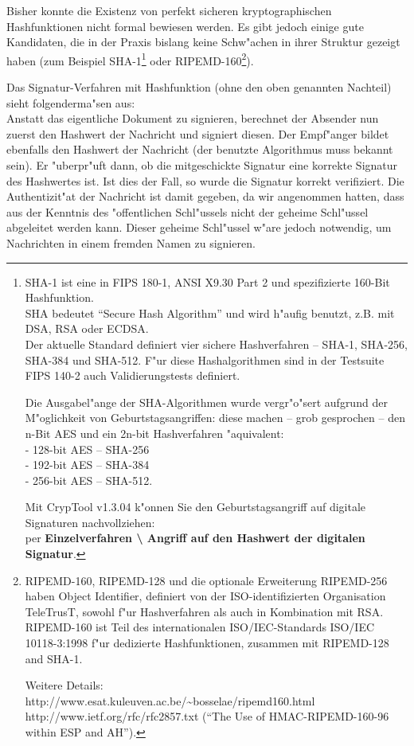 Bisher konnte die Existenz von perfekt sicheren kryptographischen
Hashfunktionen nicht formal bewiesen werden. Es gibt jedoch einige gute
Kandidaten, die in der Praxis bislang keine Schw"achen in ihrer Struktur
gezeigt haben (zum Beispiel  SHA-1\footnote{%
SHA-1  ist eine in FIPS 180-1, ANSI X9.30 Part 2 und
\cite{FIPS186} spezifizierte 160-Bit Hashfunktion.\\
SHA bedeutet ``Secure Hash Algorithm'' und wird h"aufig benutzt, z.B. 
mit DSA, RSA oder ECDSA.\\
Der aktuelle Standard \cite{FIPS180-2} definiert vier sichere Hashverfahren
-- SHA-1, SHA-256, SHA-384 und SHA-512.
F"ur diese Hashalgorithmen sind in der Testsuite FIPS 140-2 auch
Validierungstests definiert.

Die Ausgabel"ange der SHA-Algorithmen wurde vergr"o"sert aufgrund der
M"oglichkeit von Geburtstagsangriffen:
 
diese machen -- grob gesprochen -- den n-Bit AES und ein 2n-bit 
Hashverfahren "aquivalent: \\
- 128-bit AES -- SHA-256 \\
- 192-bit AES -- SHA-384 \\
- 256-bit AES -- SHA-512.

Mit CrypTool v1.3.04 k"onnen Sie den Geburtstagsangriff
 auf digitale Signaturen nachvollziehen: \\
per {\bf Einzelverfahren \textbackslash{} 
Angriff auf den Hashwert der digitalen Signatur}.
} 
oder  RIPEMD-160\footnote{%
RIPEMD-160, RIPEMD-128 und die optionale Erweiterung RIPEMD-256 haben
Object Identifier, definiert von der ISO-identifizierten Organisation
TeleTrusT, sowohl f"ur Hashverfahren als auch in Kombination mit RSA.
RIPEMD-160 ist Teil des internationalen ISO/IEC-Standards 
ISO/IEC 10118-3:1998 f"ur dedizierte Hashfunktionen, zusammen mit
RIPEMD-128 and SHA-1. 

Weitere Details: \\
http://www.esat.kuleuven.ac.be/\~{}bosselae/ripemd160.html \\
http://www.ietf.org/rfc/rfc2857.txt (``The Use of HMAC-RIPEMD-160-96 within ESP and AH'').
}).

Das Signatur-Verfahren mit Hashfunktion (ohne den oben genannten Nachteil)
sieht folgenderma"sen aus:\\ Anstatt das eigentliche Dokument zu signieren,
berechnet der Absender nun zuerst den Hashwert der Nachricht und signiert
diesen. Der Empf"anger bildet ebenfalls den Hashwert der Nachricht (der
benutzte Algorithmus muss bekannt sein). Er "uberpr"uft dann, ob die
mitgeschickte Signatur eine korrekte Signatur des Hashwertes ist. Ist dies der
Fall, so wurde die Signatur korrekt verifiziert. Die Authentizit"at der
Nachricht ist damit gegeben, da wir angenommen hatten, dass aus der Kenntnis
des "offentlichen Schl"ussels nicht der geheime Schl"ussel abgeleitet werden
kann. Dieser geheime Schl"ussel w"are jedoch notwendig, um Nachrichten in einem
fremden Namen zu signieren.

